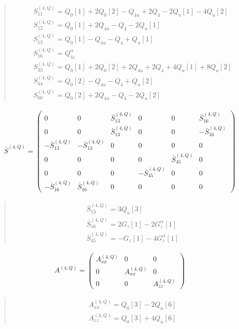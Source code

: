 \documentclass[fleqn,10pt]{jsarticle}
\begin{document}
\begin{quote}
\begin{align*}
& S^{(4,Q)}_{11} = Q_{0}[1] + 2 Q_{0}[2] - Q_{4u} + 2 Q_{4} - 2 Q_{u}[1] - 4 Q_{u}[2] \\
& S^{(4,Q)}_{12} = Q_{0}[1] + 2 Q_{4u} - Q_{4} - 2 Q_{u}[1] \\
& S^{(4,Q)}_{13} = Q_{0}[1] - Q_{4u} - Q_{4} + Q_{u}[1] \\
& S^{(4,Q)}_{16} = Q_{4z}^{\alpha} \\
& S^{(4,Q)}_{33} = Q_{0}[1] + 2 Q_{0}[2] + 2 Q_{4u} + 2 Q_{4} + 4 Q_{u}[1] + 8 Q_{u}[2] \\
& S^{(4,Q)}_{44} = Q_{0}[2] - Q_{4u} - Q_{4} + Q_{u}[2] \\
& S^{(4,Q)}_{66} = Q_{0}[2] + 2 Q_{4u} - Q_{4} - 2 Q_{u}[2]
\end{align*}
\end{quote}
\begin{align*}
\bar{S}^{(4,Q)} = \begin{pmatrix} 0 & 0 & \bar{S}^{(4,Q)}_{13} & 0 & 0 & \bar{S}^{(4,Q)}_{16} \\ 0 & 0 & \bar{S}^{(4,Q)}_{13} & 0 & 0 & - \bar{S}^{(4,Q)}_{16} \\ - \bar{S}^{(4,Q)}_{13} & - \bar{S}^{(4,Q)}_{13} & 0 & 0 & 0 & 0 \\ 0 & 0 & 0 & 0 & \bar{S}^{(4,Q)}_{45} & 0 \\ 0 & 0 & 0 & - \bar{S}^{(4,Q)}_{45} & 0 & 0 \\ - \bar{S}^{(4,Q)}_{16} & \bar{S}^{(4,Q)}_{16} & 0 & 0 & 0 & 0 \end{pmatrix}
\end{align*}
\begin{quote}
\begin{align*}
& \bar{S}^{(4,Q)}_{13} = 3 Q_{u}[3] \\
& \bar{S}^{(4,Q)}_{16} = 2 G_{z}[1] - 2 G_{z}^{\alpha}[1] \\
& \bar{S}^{(4,Q)}_{45} = - G_{z}[1] - 4 G_{z}^{\alpha}[1]
\end{align*}
\end{quote}
\begin{align*}
A^{(4,Q)} = \begin{pmatrix} A^{(4,Q)}_{xx} & 0 & 0 \\ 0 & A^{(4,Q)}_{xx} & 0 \\ 0 & 0 & A^{(4,Q)}_{zz} \end{pmatrix}
\end{align*}
\begin{quote}
\begin{align*}
& A^{(4,Q)}_{xx} = Q_{0}[3] - 2 Q_{u}[6] \\
& A^{(4,Q)}_{zz} = Q_{0}[3] + 4 Q_{u}[6]
\end{align*}
\end{quote}
\end{document}
